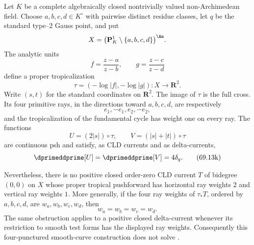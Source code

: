 \begin{proposition}
\label{prop:verified-four-punctured-cross-obstruction}
Let \(K\) be a complete algebraically closed nontrivially valued
non-Archimedean field.  Choose \(a,b,c,d\in K^\circ\) with pairwise distinct
residue classes, let \(q\) be the standard type--\(2\) Gauss point, and put
\[
 X=\bigl(\mathbf P^1_K\setminus\{a,b,c,d\}\bigr)^{\An}.
\]
The analytic units
\[
 f=\frac{z-a}{z-b},\qquad g=\frac{z-c}{z-d}
\]
define a proper tropicalization
\[
 \tau=(-\log|f|,-\log|g|):X\longrightarrow\mathbf R^2.
\]
Write \((s,t)\) for the standard coordinates on \(\mathbf R^2\).  The image
of \(\tau\) is the full cross.  Its four primitive rays, in the directions
toward \(a,b,c,d\), are respectively
\[
                         e_1,-e_1,e_2,-e_2,
\]
and the tropicalization of the fundamental cycle has weight one on every
ray.  The functions
\[
               U=(2|s|)\circ\tau,
        \qquad V=(|s|+|t|)\circ\tau
\]
are continuous psh and satisfy, as CLD currents and as delta-currents,
\[
                  \dprimeddprime[U]
                  =\dprimeddprime[V]=4\delta_q.
\tag{69.13k}\label{eq:verified-four-punctured-curvature}
\]

Nevertheless, there is no positive closed order-zero CLD current \(T\) of
bidegree \((0,0)\) on \(X\) whose proper tropical pushforward has horizontal
ray weights \(2\) and vertical ray weights \(1\).  More generally, if the
four ray weights of \(\tau_*T\), ordered by \(a,b,c,d\), are
\(w_a,w_b,w_c,w_d\), then
\[
                         w_a=w_b=w_c=w_d.
\tag{69.13l}\label{eq:verified-four-punctured-equal-weights}
\]
The same obstruction applies to a positive closed delta-current whenever
its restriction to smooth test forms has the displayed ray weights.
Consequently this four-punctured smooth-curve construction does not solve
.
\end{proposition}


